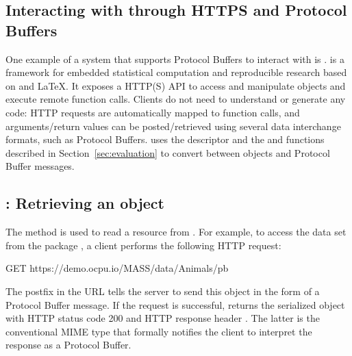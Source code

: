 \documentclass[article]{jss}
\begin{document}
\subsection[Interacting with R through HTTPS and Protocol Buffers]{Interacting with  through HTTPS and Protocol Buffers}

One example of a system that supports Protocol Buffers to interact
with  is  \citep{opencpu}.  is a framework
for embedded statistical computation and reproducible research based
on  and \LaTeX. It exposes a HTTP(S) API to access and
manipulate  objects and execute remote 
function calls. Clients do not need to understand or generate any
 code: HTTP requests are automatically mapped to function
calls, and arguments/return values can be posted/retrieved using
several data interchange formats, such as Protocol Buffers.  
uses the  descriptor and the  and
 functions described in
Section~\ref{sec:evaluation} to convert between  objects
and Protocol Buffer messages.

\subsection[HTTP GET: Retrieving an R object]{: Retrieving an  object}

The  method is used to read a resource from
. For example, to access the data set  from the
package  \citep{MASS}, a client performs the following HTTP
request:
%
\begin{CodeChunk}
\begin{CodeInput}
GET https://demo.ocpu.io/MASS/data/Animals/pb
\end{CodeInput}
\end{CodeChunk}
%
The postfix  in the URL tells the server to send this
object in the form of a Protocol Buffer message.
If the request
is successful,  returns the serialized object with HTTP status
code 200 and HTTP response header .
The latter is the conventional MIME type that formally notifies the client to
interpret the response as a Protocol Buffer.
\end{document}
